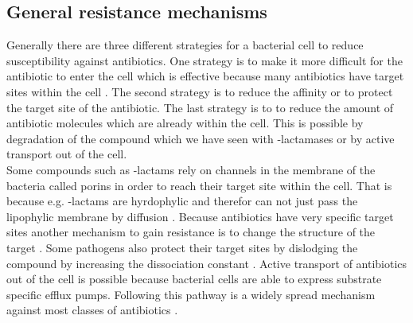 \subsection{General resistance mechanisms}
Generally there are three different strategies for a bacterial cell to reduce susceptibility against antibiotics. One strategy is to make it more difficult for the antibiotic to enter the cell which is effective because many antibiotics have target sites within the cell \cite{barreteau_cytoplasmic_2008}. The second strategy is to reduce the affinity or to protect the target site of the antibiotic. The last strategy is to  to reduce the amount of antibiotic molecules which are already within the cell. This is possible by degradation of the compound which we have seen with \textbeta-lactamases or by active transport out of the cell.\\
Some compounds such as \textbeta-lactams rely on channels in the membrane of the bacteria called porins in order to reach their target site within the cell. That is because e.g. \textbeta-lactams are hyrdophylic and therefor can not just pass the lipophylic membrane by diffusion \cite{munita_mechanisms_2016}. Because antibiotics have very specific target sites another mechanism to gain resistance is to change the structure of the target \cite{munita_mechanisms_2016}. Some pathogens also protect their target sites by dislodging the compound by increasing the dissociation constant \cite{connell_ribosomal_2003}.
Active transport of antibiotics out of the cell is possible because bacterial cells are able to express substrate specific efflux pumps. Following this pathway is a widely spread mechanism against most classes of antibiotics \cite{munita_mechanisms_2016}.


